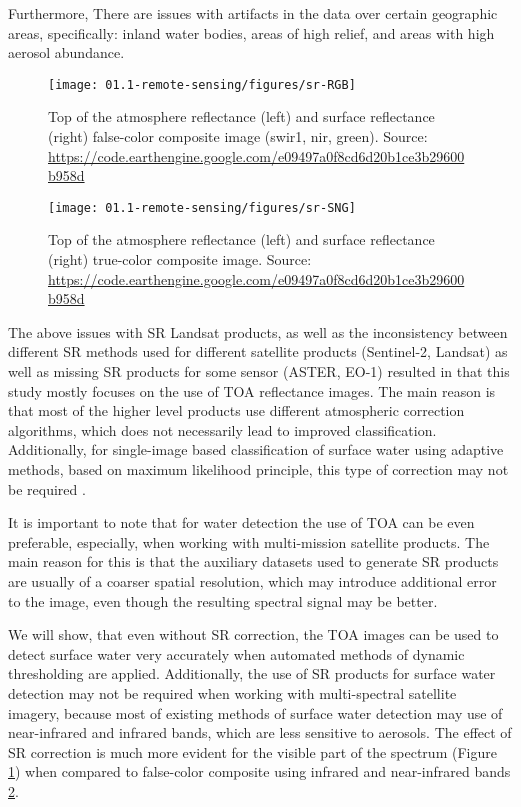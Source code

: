 Furthermore, There are issues with artifacts in the data over certain geographic areas, specifically: inland water bodies, areas of high relief, and areas with high aerosol abundance. 

\begin{figure}
	\texttt{[image: 01.1-remote-sensing/figures/sr-RGB]}
	\caption{Top of the atmosphere reflectance (left) and surface reflectance (right) false-color composite image (swir1, nir, green). Source: \url{https://code.earthengine.google.com/e09497a0f8cd6d20b1ce3b29600b958d}}
	\label{fig:example-sr-rgb}
\end{figure}

\begin{figure}
	\texttt{[image: 01.1-remote-sensing/figures/sr-SNG]}
	\caption{Top of the atmosphere reflectance (left) and surface reflectance (right) true-color composite image. Source: \url{https://code.earthengine.google.com/e09497a0f8cd6d20b1ce3b29600b958d}}
	\label{fig:example-sr-sng}
\end{figure}

The above issues with SR Landsat products, as well as the inconsistency between different SR methods used for different satellite products (Sentinel-2, Landsat) as well as missing SR products for some sensor (ASTER, EO-1) resulted in that this study mostly focuses on the use of TOA reflectance images. The main reason is that most of the higher level products use different atmospheric correction algorithms, which does not necessarily lead to improved classification. Additionally, for single-image based classification of surface water using adaptive methods, based on maximum likelihood principle, this type of correction may not be required \citep{song2001classification}.

It is important to note that for water detection the use of TOA can be even preferable, especially, when working with multi-mission satellite products. The main reason for this is that the auxiliary datasets used to generate SR products are usually of a coarser spatial resolution, which may introduce additional error to the image, even though the resulting spectral signal may be better. 

We will show, that even without SR correction, the TOA images can be used to detect surface water very accurately when automated methods of dynamic thresholding are applied. Additionally, the use of SR products for surface water detection may not be required when working with multi-spectral satellite imagery, because most of existing methods of surface water detection may use of near-infrared and infrared bands, which are less sensitive to aerosols. The effect of SR correction is much more evident for the visible part of the spectrum (Figure \ref{fig:example-sr-rgb}) when compared to false-color composite using infrared and near-infrared bands \ref{fig:example-sr-sng}.

